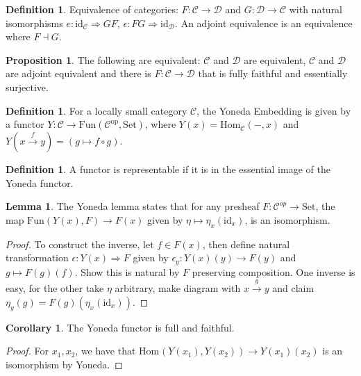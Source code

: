 \documentclass[a4paper,10pt]{article}
\theoremstyle{definition}
\newtheorem{definition}[theorem]{Definition}
\newtheorem{corollary}[theorem]{Corollary}
\newtheorem{lemma}[theorem]{Lemma}
\newtheorem{proposition}[theorem]{Proposition}
\newcommand{\Hom}[3][C]{\mathrm{Hom}_\mathcal{#1}(#2, #3)}
\newcommand{\C}{\mathcal{C}}
\newcommand{\D}{\mathcal{D}}
\newcommand{\id}{\mathrm{id}}
\newcommand{\Set}{\mathrm{Set}}
\begin{document}
\begin{definition}
    Equivalence of categories: $F \colon \C \rightarrow \D$ and $G \colon \D \rightarrow \C$ with natural isomorphisms $e \colon \id_{\C} \Rightarrow GF$, $\epsilon \colon FG \Rightarrow \id_{\D}$. An adjoint equivalence is an equivalence where $F \dashv G$.
\end{definition}

\begin{proposition}
    The following are equivalent: $\C$ and $\D$ are equivalent, $\C$ and $\D$ are adjoint equivalent and there is $F \colon \C \rightarrow \D$ that is fully faithful and essentially surjective. 
\end{proposition}

\begin{definition}
    For a locally small category $\C$, the Yoneda Embedding is given by a functor $Y \colon \C \longrightarrow \mathrm{Fun}(\C^\mathrm{op}, \Set)$, where $Y(x) = \Hom{-}{x}$ and $Y(x \xrightarrow{f} y)= (g \mapsto f \circ g)$.
\end{definition}

\begin{definition}
    A functor is representable if it is in the essential image of the Yoneda functor. 
\end{definition}

\begin{lemma}
    The Yoneda lemma states that for any presheaf $F \colon \C^{op} \rightarrow \Set$, the map $\mathrm{Fun}(Y(x), F) \rightarrow F(x)$ given by $\eta \mapsto \eta_x(\id_x)$, is an isomorphism.
\end{lemma}

\begin{proof}
    To construct the inverse, let $f \in F(x)$, then define natural transformation $\epsilon \colon Y(x) \Rightarrow F$ given by $\epsilon_y \colon Y(x)(y) \rightarrow F(y)$ and $g \mapsto F(g)(f)$. Show this is natural by $F$ preserving composition. One inverse is easy, for the other take $\eta$ arbitrary, make diagram with $x \xrightarrow{g} y$ and claim $\eta_y(g) = F(g)(\eta_x(\id_x))$.
\end{proof}

\begin{corollary}
    The Yoneda functor is full and faithful.
\end{corollary}
\begin{proof}
    For $x_1, x_2$, we have that $\Hom[{}]{Y({x_1})}{Y(x_2)} \longrightarrow Y(x_1)(x_2)$ is an isomorphism by Yoneda. 
\end{proof}
\end{document}
